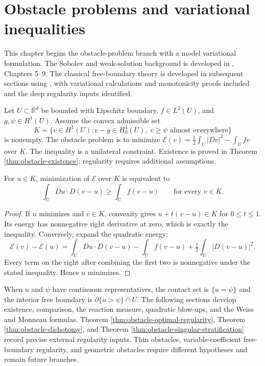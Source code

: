\chapter{Obstacle problems and variational inequalities}\label{sec:obstacle-problems}
This chapter begins the obstacle-problem branch with a model variational formulation. The Sobolev and weak-solution background is developed in \cite{SimonPDE}, Chapters 5--9. The classical free-boundary theory is developed in subsequent sections using \cite{Fig18}, with variational calculations and monotonicity proofs included and the deep regularity inputs identified.

\begin{definition}\label{def:obstacle-problem}
Let $U\subset\mathbb R^d$ be bounded with Lipschitz boundary, $f\in L^2(U)$, and $g,\psi\in H^1(U)$. Assume the convex admissible set
\[
 K=\{v\in H^1(U):v-g\in H^1_0(U),\ v\geq\psi\text{ almost everywhere}\}
\]
is nonempty. The obstacle problem is to minimize
$\mathcal E(v)=\frac12\int_U|Dv|^2-\int_Ufv$
over $K$. The inequality is a unilateral constraint. Existence is proved in Theorem \ref{thm:obstacle-existence}; regularity requires additional assumptions.
\end{definition}

\begin{proposition}\label{prop:obstacle-inequality}
For $u\in K$, minimization of $\mathcal E$ over $K$ is equivalent to
\[
 \int_U Du\cdot D(v-u)\geq\int_U f(v-u)\qquad\text{for every }v\in K.
\]
\end{proposition}
\begin{proof}
If $u$ minimizes and $v\in K$, convexity gives $u+t(v-u)\in K$ for $0\leq t\leq1$. Its energy has nonnegative right derivative at zero, which is exactly the inequality. Conversely, expand the quadratic energy:
\[
 \mathcal E(v)-\mathcal E(u)
 =\int_U Du\cdot D(v-u)-\int_U f(v-u)+\tfrac12\int_U|D(v-u)|^2.
\]
Every term on the right after combining the first two is nonnegative under the stated inequality. Hence $u$ minimizes.
\end{proof}

\begin{remark}\label{rem:obstacle-program}
When $u$ and $\psi$ have continuous representatives, the contact set is $\{u=\psi\}$ and the interior free boundary is $\partial\{u>\psi\}\cap U$. The following sections develop existence, comparison, the reaction measure, quadratic blow-ups, and the Weiss and Monneau formulas. Theorem \ref{thm:obstacle-optimal-regularity}, Theorem \ref{thm:obstacle-dichotomy}, and Theorem \ref{thm:obstacle-singular-stratification} record precise external regularity inputs. Thin obstacles, variable-coefficient free-boundary regularity, and geometric obstacles require different hypotheses and remain future branches.
\end{remark}
